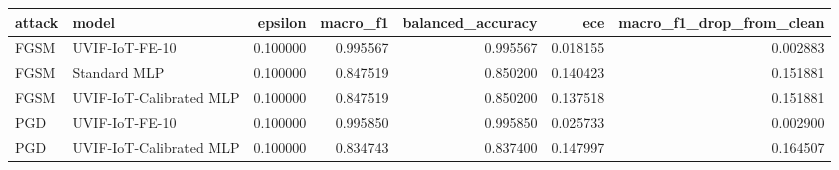\begin{tabular}{llrrrrr}
\toprule
attack & model & epsilon & macro\_f1 & balanced\_accuracy & ece & macro\_f1\_drop\_from\_clean \\
\midrule
FGSM & UVIF-IoT-FE-10 & 0.100000 & 0.995567 & 0.995567 & 0.018155 & 0.002883 \\
FGSM & Standard MLP & 0.100000 & 0.847519 & 0.850200 & 0.140423 & 0.151881 \\
FGSM & UVIF-IoT-Calibrated MLP & 0.100000 & 0.847519 & 0.850200 & 0.137518 & 0.151881 \\
PGD & UVIF-IoT-FE-10 & 0.100000 & 0.995850 & 0.995850 & 0.025733 & 0.002900 \\
PGD & UVIF-IoT-Calibrated MLP & 0.100000 & 0.834743 & 0.837400 & 0.147997 & 0.164507 \\
\bottomrule
\end{tabular}
